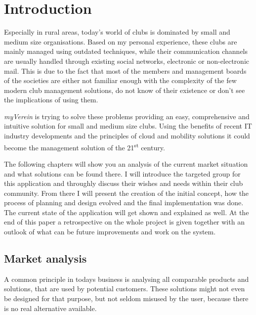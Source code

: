 \pagestyle{fancy}
\lhead{}
\renewcommand{\headrulewidth}{0pt}
\setlength{\headheight}{14pt}

\chapter{Introduction}
\label{chapter:Intro}

Especially in rural areas, today's world of clubs is dominated by small and medium size organisations. Based on my personal experience, these clubs are mainly managed using outdated techniques, while their communication channels are usually handled through existing social networks, electronic or non-electronic mail. This is due to the fact that most of the members and management boards of the societies are either not familiar enough with the complexity of the few modern club management solutions, do not know of their existence or don't see the implications of using them.

\emph{myVerein} is trying to solve these problems providing an easy, comprehensive and intuitive solution for small and medium size clubs. Using the benefits of recent IT industry developments and the principles of cloud and mobility solutions it could become the management solution of the 21\textsuperscript{st} century. 

The following chapters will show you an analysis of the current market situation and what solutions can be found there. I will introduce the targeted group for this application and throughly discuss their wishes and needs within their club community. From there I will present the creation of the initial concept, how the process of planning and design evolved and the final implementation was done. The current state of the application will get shown and explained as well. At the end of this paper a retrospective on the whole project is given together with an outlook of what can be future improvements and work on the system.

\section{Market analysis}
\label{sec:MarketAnalysis}

A common principle in todays business is analysing all comparable products and solutions, that are used by potential customers. These solutions might not even be designed for that purpose, but not seldom misused by the user, because there is no real alternative available.

